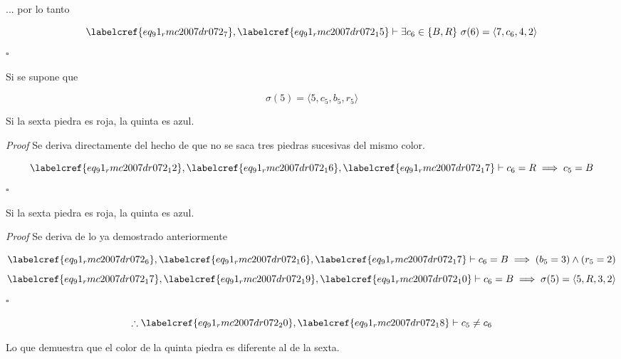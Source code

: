 ... por lo tanto

\begin{equation} \label{eq_91_rmc2007dr072_16}
	\labelcref{eq_91_rmc2007dr072_7}, \labelcref{eq_91_rmc2007dr072_15} \vdash \exists c_6 \in \{B,R\}\ \sigma(6) = \langle 7, c_6, 4, 2 \rangle
\end{equation}
\hfill $\square$

Si se supone que 

\begin{equation} \label{eq_91_rmc2007dr072_17}
	\sigma(5) = \langle 5, c_5, b_5, r_5 \rangle
\end{equation}

\begin{claim}
	Si la sexta piedra es roja, la quinta es azul.
\end{claim}

\textit{Proof} Se deriva directamente del hecho de que no se saca tres piedras sucesivas del mismo color.

\begin{equation} \label{eq_91_rmc2007dr072_18}
	\labelcref{eq_91_rmc2007dr072_12}, \labelcref{eq_91_rmc2007dr072_16}, \labelcref{eq_91_rmc2007dr072_17} \vdash c_6 = R \implies c_5=B
\end{equation}
\hfill $\square$

\begin{claim}
	Si la sexta piedra es roja, la quinta es azul.
\end{claim}

\textit{Proof} Se deriva de lo ya demostrado anteriormente

\begin{equation} \label{eq_91_rmc2007dr072_19}
	\labelcref{eq_91_rmc2007dr072_6}, \labelcref{eq_91_rmc2007dr072_16}, \labelcref{eq_91_rmc2007dr072_17} \vdash c_6 = B \implies (b_5 = 3) \land (r_5=2)
\end{equation}
\begin{equation} \label{eq_91_rmc2007dr072_20}
	\labelcref{eq_91_rmc2007dr072_17}, \labelcref{eq_91_rmc2007dr072_19}, \labelcref{eq_91_rmc2007dr072_10} \vdash c_6 = B \implies \sigma(5) = \langle 5, R, 3, 2 \rangle
\end{equation}
\hfill $\square$

\begin{equation} \label{eq_91_rmc2007dr072_21}
	\therefore \labelcref{eq_91_rmc2007dr072_20}, \labelcref{eq_91_rmc2007dr072_18} \vdash c_5 \neq c_6
\end{equation}

\vspace{1cm}
Lo que demuestra que el color de la quinta piedra es diferente al de la sexta. \\\\\\
